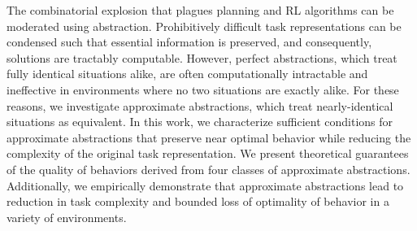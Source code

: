 The combinatorial explosion that plagues planning and \ac{RL} algorithms can be moderated using abstraction. Prohibitively difficult task representations can be condensed such that essential information is preserved, and consequently, solutions are tractably computable. However, perfect abstractions, which treat fully identical situations alike, are often computationally intractable and ineffective in environments where no two situations are exactly alike. For these reasons, we investigate approximate abstractions, which treat nearly-identical situations as equivalent. In this work, we characterize sufficient conditions for approximate abstractions that preserve near optimal behavior while reducing the complexity of the original task representation. We present theoretical guarantees of the quality of behaviors derived from four classes of approximate abstractions. Additionally, we empirically demonstrate that approximate abstractions lead to reduction in task complexity and bounded loss of optimality of behavior in a variety of environments. %










%
%





